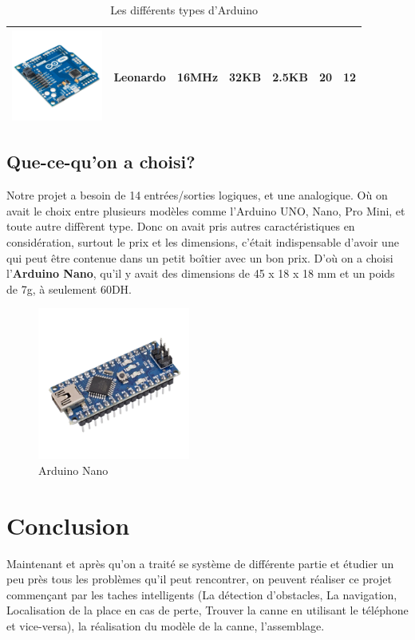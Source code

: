 \begin{table}[hbt!]
\begin{tabular}{|C{3cm}|C{2cm}|C{2.2cm}|C{2.2cm}|C{1.2cm}|C{1.5cm}|C{1.2cm}|}
        \hline
        \includegraphics[width=3cm]{assets/arduino/pro.png} & Leonardo & 16MHz & 32KB & 2.5KB & 20 & 12 \\
        \hline
    \end{tabular}
    \caption{Les différents types d'Arduino \cite{arduino-types}}
\end{table}

\FloatBarrier

\subsection{Que-ce-qu'on a choisi?}

Notre projet a besoin de 14 entrées/sorties logiques, et une analogique. Où on avait le choix entre plusieurs modèles comme l'Arduino UNO, Nano, Pro Mini, et toute autre diffèrent type. Donc on avait pris autres caractéristiques en considération, surtout le prix et les dimensions, c'était indispensable d'avoir une qui peut être contenue dans un petit boîtier avec un bon prix. D'où on a choisi l'\textbf{Arduino Nano}, qu'il y avait des dimensions de 45 x 18 x 18 mm et un poids de 7g, à seulement 60DH.


\begin{figure}[hbt!]
    \centering
    \includegraphics[width=5cm]{assets/arduino/nano.png}
    \caption{Arduino Nano}
\end{figure}

\section{Conclusion}

Maintenant et après qu’on a traité se système de différente partie et étudier un peu près tous les problèmes qu’il peut rencontrer, on peuvent réaliser ce projet commençant par les taches intelligents (La détection d’obstacles, La navigation, Localisation de la place en cas de perte, Trouver la canne en utilisant le téléphone et vice-versa), la réalisation du modèle de la canne, l’assemblage.